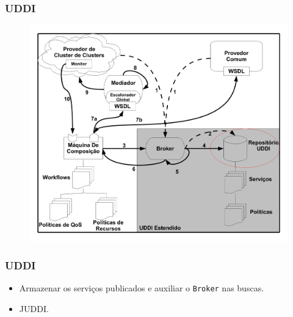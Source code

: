 \documentclass[red, cover=invisible, theme=Warsaw]{myslides}
\begin{document}
	\begin{frame} \frametitle{UDDI}
	    \begin{center}
		\begin{figure}
		\includegraphics[scale=0.25]{imagens/execComposicaoA-3.pdf}	    
		\end{figure}
	    \end{center}
	\end{frame}
	
	\begin{frame} \frametitle{UDDI}
	    \begin{itemize}
		\item Armazenar os serviços publicados e auxiliar o \texttt{Broker} nas buscas.
		\item JUDDI.
	    \end{itemize}
	\end{frame}
	
\end{document}
